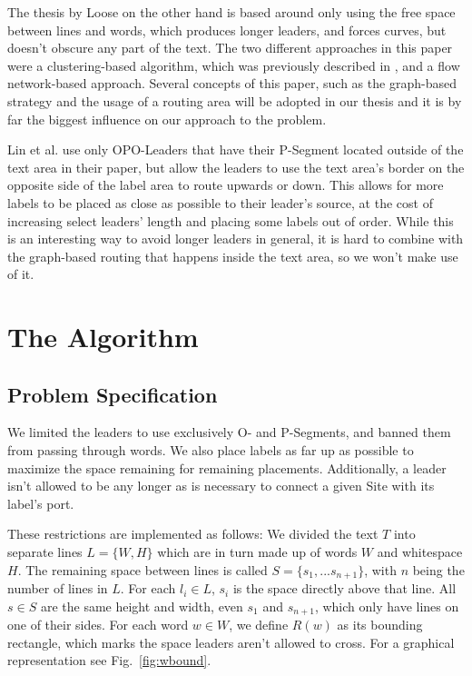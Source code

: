 \documentclass[11pt,a4paper]{vutinfth}
\begin{document}
The thesis by Loose\cite{Loose2015} on the other hand is based around only using the free space between lines and words, which produces longer leaders, and forces curves, but doesn't obscure any part of the text. The two different approaches in this paper were a clustering-based algorithm, which was previously described in \cite{Nollenburg2010}, and a flow network-based approach. Several concepts of this paper, such as the graph-based strategy and the usage of a routing area will be adopted in our thesis and it is by far the biggest influence on our approach to the problem.  %

Lin et al.\cite{Lin2009} use only OPO-Leaders that have their P-Segment located outside of the text area in their paper, but allow the leaders to use the text area's border on the opposite side of the label area to route upwards or down. This allows for more labels to be placed as close as possible to their leader's source, at the cost of increasing select leaders' length and placing some labels out of order. While this is an interesting way to avoid longer leaders in general, it is hard to combine with the graph-based routing that happens inside the text area, so we won't make use of it.


\chapter{The Algorithm}
\section{Problem Specification}
We limited the leaders to use exclusively O- and P-Segments, and banned them from passing through words. We also place labels as far up as possible to maximize the space remaining for  remaining placements. Additionally, a leader isn't allowed to be any longer as is necessary to connect a given Site with its label's port.

These restrictions are implemented as follows: We divided the text $T$ into separate lines $L=\{W,H\}$ which are in turn made up of words $W$ and whitespace $H$. The remaining space between lines is called $S=\{s_1, ... s_{n+1}\}$, with $n$ being the number of lines in $L$. For each $l_i \in L$,  $s_i$ is the space directly above that line. All $s \in S$ are the same height and width, even $s_1$ and $s_{n+1}$, which only have lines on one of their sides. For each word $w \in W$, we define $R(w)$  as its bounding rectangle, which marks the space leaders aren't allowed to cross. For a graphical representation see Fig.~\ref{fig:wbound}.
\end{document}
